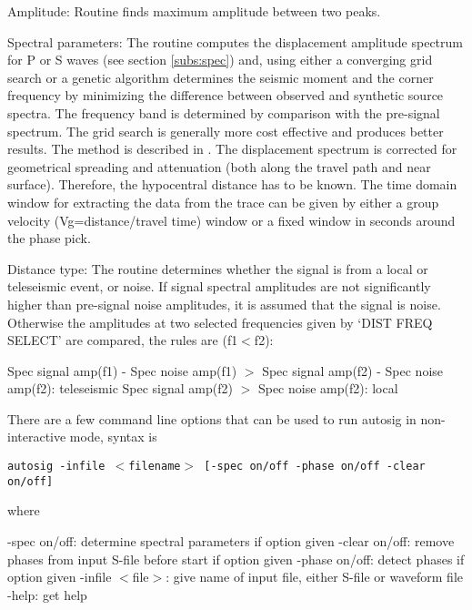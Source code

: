 Amplitude: \newline
Routine finds maximum amplitude between two peaks. 

Spectral parameters:\newline
{} 
The routine computes the displacement amplitude spectrum for P or S waves (see section \ref{subs:spec}) and, using either a converging grid search or a genetic algorithm determines the seismic moment and the corner frequency by minimizing the difference between observed and synthetic source spectra. The frequency band is determined by comparison with the pre-signal spectrum. The grid search is generally more cost effective and produces better results. The method is described in \citet{ottemoller2003}. The displacement spectrum is corrected for geometrical spreading and attenuation (both along the travel path and near surface). Therefore, the hypocentral distance has to be known. The time domain window for extracting the data from the trace can be given by either a group velocity (Vg=distance/travel time) window or a fixed window in seconds around the phase pick. 

Distance type: \newline
The routine determines whether the signal is from a local or teleseismic event, or noise. If signal spectral amplitudes are not significantly higher than pre-signal noise amplitudes, it is assumed that the signal is noise. Otherwise the amplitudes at two selected frequencies given by `DIST FREQ SELECT' are compared, the rules are (f1$<$f2): 

Spec signal amp(f1) - Spec noise amp(f1) $>$ Spec signal amp(f2) - Spec noise amp(f2): teleseismic \newline
Spec signal amp(f2) $>$ Spec noise amp(f2): local 

There are a few command line options that can be used to run autosig in non-interactive mode, 
syntax is 

\texttt{autosig -infile $<$filename$>$ [-spec on/off -phase on/off -clear on/off]}

where 

-spec on/off: determine spectral parameters if option given \newline
-clear on/off: remove phases from input S-file before start if option given \newline
-phase on/off: detect phases if option given \newline
-infile $<$file$>$: give name of input file, either S-file or waveform file \newline
-help: get help 

